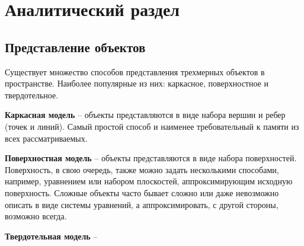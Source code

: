 



\newpage
\section{Аналитический раздел}

\subsection{Представление объектов}

Существует множество способов представления трехмерных объектов в пространстве.
Наиболее популярные из них: каркасное, поверхностное и твердотельное.

\textbf{Каркасная модель} -- объекты представляются в виде набора вершин и
ребер (точек и линий). Самый простой способ и наименее требовательный к памяти
из всех рассматриваемых.

\textbf{Поверхностная модель} -- объекты представляются в виде набора
поверхностей. Поверхность, в свою очередь, также можно задать несколькими
способами, например, уравнением или набором плоскостей, аппроксимирующим
исходную поверхность. Сложные объекты часто бывает сложно или даже невозможно
описать в виде системы уравнений, а аппроксимировать, с другой стороны,
возможно всегда.

\textbf{Твердотельная модель} -- %

\cite{m3m}



